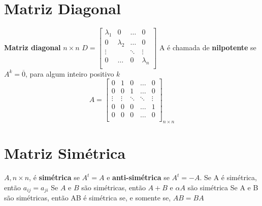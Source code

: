 \documentclass{article}
\begin{document}
\section{Matriz Diagonal}

 \textbf{Matriz diagonal} $n \times n$
 $ D = 
 \begin{bmatrix}
    \lambda_1 & 0 & \hdots & 0 \\
    0 &  \lambda_2 & \hdots & 0 \\
    \vdots & & \ddots & \vdots \\
    0 & \hdots & 0 & \lambda_n \\
\end{bmatrix}
 $ A é chamada de \textbf{nilpotente} se $A^k = \overline{0}$, para algum inteiro positivo $k$
$$
A = \begin{bmatrix}
    0 & 1 & 0 & \hdots & 0 \\
    0 & 0 & 1 & \hdots & 0 \\
    \vdots & \vdots & \ddots & \ddots & \vdots \\
    0 & 0 & 0 & \hdots & 1 \\
    0 & 0 & 0 & \hdots & 0 \\
\end{bmatrix}_{n \times n}
$$

\section{Matriz Simétrica}

$A, n \times n$, é \textbf{simétrica} se $A^t = A$ e \textbf{anti-simétrica} se $A^t = -A$.
Se A é simétrica, então $a_{ij} = a_{ji}$ \newline
Se $A$ e $B$ são simétricas, então $A + B$ e $\alpha A$ são simétrica \newline
Se A e B são simétricas, então AB é simétrica se, e somente se, $AB = BA$


 
\end{document}
